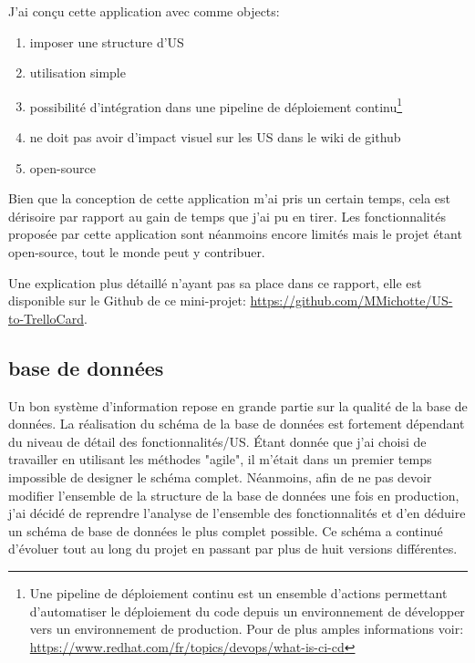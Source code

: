 \newpara

J'ai conçu cette application avec comme objects: 
\begin{enumerate}
  \item imposer une structure d'US
  \item utilisation simple
  \item possibilité d'intégration dans une pipeline de déploiement continu\footnote{Une pipeline de déploiement continu est un ensemble d'actions permettant d'automatiser le déploiement du code depuis un environnement de développer vers un environnement de production. Pour de plus amples informations voir: \url{https://www.redhat.com/fr/topics/devops/what-is-ci-cd}}
  \item ne doit pas avoir d'impact visuel sur les US dans le wiki de github
  \item open-source
\end{enumerate}

\newpara

Bien que la conception de cette application m'ai pris un certain temps, cela est dérisoire par rapport au gain de temps que j'ai pu en tirer. Les fonctionnalités proposée par cette application sont néanmoins encore limités mais le projet étant open-source, tout le monde peut y contribuer. 

\newpara

Une explication plus détaillé n'ayant pas sa place dans ce rapport, elle est disponible sur le Github de ce mini-projet: \url{https://github.com/MMichotte/US-to-TrelloCard}.


\subsection{base de données}
Un bon système d'information repose en grande partie sur la qualité de la base de données.  
La réalisation du schéma de la base de données est fortement dépendant du niveau de détail des fonctionnalités/US. Étant donnée que j'ai choisi de travailler en utilisant les méthodes "agile", il m'était dans un premier temps impossible de designer le schéma complet. Néanmoins, afin de ne pas devoir modifier l'ensemble de la structure de la base de données une fois en production, j'ai décidé de reprendre l'analyse de l'ensemble des fonctionnalités et d'en déduire un schéma de base de données le plus complet possible. Ce schéma a continué d'évoluer tout au long du projet en passant par plus de huit versions différentes.

\newpara

